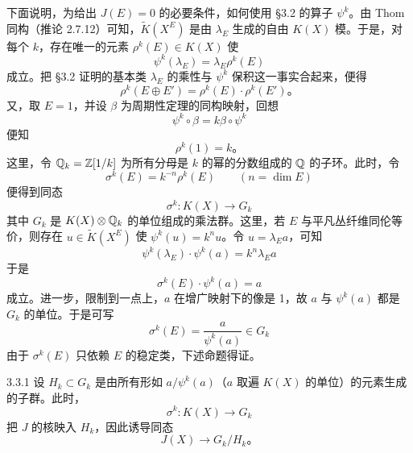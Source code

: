 下面说明，为给出 $J(E)=0$ 的必要条件，如何使用 §3.2 的算子 $\psi^k$。由 Thom 同构（推论 2.7.12）可知，$\tilde K(X^E)$ 是由 $\lambda_E$ 生成的自由 $K(X)$ 模。于是，对每个 $k$，存在唯一的元素 $\rho^k(E)\in K(X)$ 使
\begin{equation*}
  \psi^k(\lambda_E)=\lambda_E\rho^k(E)
\end{equation*}
成立。把 §3.2 证明的基本类 $\lambda_E$ 的乘性与 $\psi^k$ 保积这一事实合起来，便得
\begin{equation*}
  \rho^k(E\oplus E')=\rho^k(E)\cdot\rho^k(E')\text{。}
\end{equation*}
又，取 $E=1$，并设 $\beta$ 为周期性定理的同构映射，回想
\begin{equation*}
  \psi^k\circ\beta=k\beta\circ\psi^k
\end{equation*}
便知
\begin{equation*}
  \rho^k(1)=k\text{。}
\end{equation*}
这里，令 $\mathbb{Q}_k=\mathbb{Z}[1/k]$ 为所有分母是 $k$ 的幂的分数组成的 $\mathbb{Q}$ 的子环。此时，令
\begin{equation*}
  \sigma^k(E)=k^{-n}\rho^k(E)\qquad(n=\dim E)
\end{equation*}
便得到同态
\begin{equation*}
  \sigma^k: K(X)\longrightarrow G_k
\end{equation*}
其中 $G_k$ 是 $K(X)\otimes\mathbb{Q}_k$ 的单位组成的乘法群。这里，若 $E$ 与平凡丛纤维同伦等价，则存在 $u\in\tilde K(X^E)$ 使 $\psi^k(u)=k^nu$。令 $u=\lambda_Ea$，可知
\begin{equation*}
  \psi^k(\lambda_E)\cdot\psi^k(a)=k^n\lambda_Ea
\end{equation*}
于是
\begin{equation*}
  \sigma^k(E)\cdot\psi^k(a)=a
\end{equation*}
成立。进一步，限制到一点上，$a$ 在增广映射下的像是 1，故 $a$ 与 $\psi^k(a)$ 都是 $G_k$ 的单位。于是可写
\begin{equation*}
  \sigma^k(E)=\frac{a}{\psi^k(a)}\in G_k
\end{equation*}
由于 $\sigma^k(E)$ 只依赖 $E$ 的稳定类，下述命题得证。

\begin{proposition*}{3.3.1}
  设 $H_k\subset G_k$ 是由所有形如 $a/\psi^k(a)$（$a$ 取遍 $K(X)$ 的单位）的元素生成的子群。此时，
  \begin{equation*}
    \sigma^k: K(X)\longrightarrow G_k
  \end{equation*}
  把 $J$ 的核映入 $H_k$，因此诱导同态
  \begin{equation*}
    J(X)\longrightarrow G_k/H_k\text{。}
  \end{equation*}
\end{proposition*}


